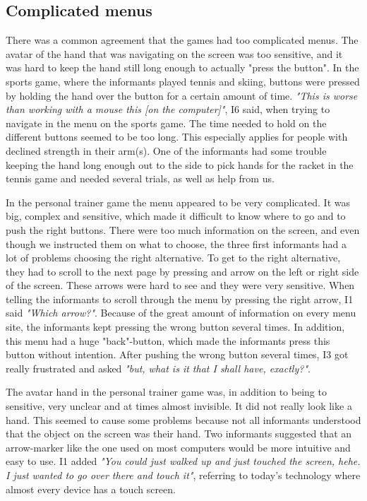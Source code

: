 \subsection{Complicated menus}
There was a common agreement that the games had too complicated menus.  The avatar of the hand that was navigating on the screen was too sensitive, and it was hard to keep the hand still long enough to actually "press the button". In the sports game, where the informants played tennis and skiing, buttons were pressed by holding the hand over the button for a certain amount of time. \emph{"This is worse than working with a mouse this [on the computer]"}, I6 said, when trying to navigate in the menu on the sports game. The time needed to hold on the different buttons seemed to be too long. This especially applies for people with declined strength in their arm(s). One of the informants had some trouble keeping the hand long enough out to the side to pick hands for the racket in the tennis game and needed several trials, as well as help from us.

In the personal trainer game the menu appeared to be very complicated. It was big, complex and sensitive, which made it difficult to know where to go and to push the right buttons. There were too much information on the screen, and even though we instructed them on what to choose, the three first informants had a lot of problems choosing the right alternative. To get to the right alternative, they had to scroll to the next page by pressing and arrow on the left or right side of the screen. These arrows were hard to see and they were very sensitive. When telling the informants to scroll through the menu by pressing the right arrow, I1 said \emph{"Which arrow?"}. Because of the great amount of information on every menu site, the informants kept pressing the wrong button several times. In addition, this menu had a huge "back"-button, which made the informants press this button without intention. After pushing the wrong button several times, I3 got really frustrated and asked \emph{"but, what is it that I shall have, exactly?"}. 

The avatar hand in the personal trainer game was, in addition to being to sensitive, very unclear and at times almost invisible. It did not really look like a hand. This seemed to cause some problems because not all informants understood that the object on the screen was their hand. Two informants suggested that an arrow-marker like the one used on most computers would be more intuitive and easy to use. I1 added \emph{"You could just walked up and just touched the screen, hehe. I just wanted to go over there and touch it"}, referring to today's technology where almost every device has a touch screen.    

